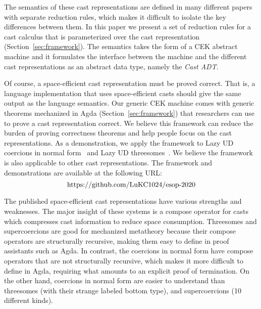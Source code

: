 \documentclass[runningheads]{llncs}
\newcommand{\urlFrameworkAndIllustration}{
	\url{https://github.com/LuKC1024/esop-2020}
}
\begin{document}
The semantics of these cast representations are defined in many
different papers with separate reduction rules, which makes it
difficult to isolate the key differences between them.  In this paper
we present a set of reduction rules for a cast calculus that
is parameterized over the cast representation
(Section~\ref{sec:framework}).
The semantics takes the form of a CEK
abstract machine and it formulates the interface between the machine
and the different cast representations as an abstract data type,
namely the \emph{Cast ADT}.

Of course, a space-efficient cast representation must be proved
correct. That is, a language implementation that uses space-efficient
casts should give the same output as the language semantics. Our
generic CEK machine comes with generic theorems mechanized in Agda
(Section~\ref{sec:framework}) that researchers can use to prove a cast
representation correct.  We believe this framework can reduce the
burden of proving correctness theorems and help people focus on the
cast representations. As a demonstration, we apply the framework to
Lazy UD coercions in normal form~\citep{Siek:2015:BCT:2737924.2737968}
and Lazy UD threesomes~\citep{Siek:2010:TWB:1706299.1706342}. We
believe the framework is also applicable to other cast
representations. The framework and demonstrations are available at the
following URL:
\[\text{\urlFrameworkAndIllustration}\]


The published space-efficient cast representations have various
strengths and weaknesses.  The major insight of these systems is a
compose operator for casts which compresses cast information to reduce
space consumption.  Threesomes and supercoercions are good for
mechanized metatheory because their compose operators are structurally
recursive, making them easy to define in proof assistants such as
Agda. In contrast, the coercions in normal form have compose operators
that are not structurally recursive, which makes it more difficult to
define in Agda, requiring what amounts to an explicit proof of
termination.
%
On the other hand, coercions in normal form are easier to understand
than threesomes (with their strange labeled bottom type), and
supercoercions (10 different kinds).
\end{document}
